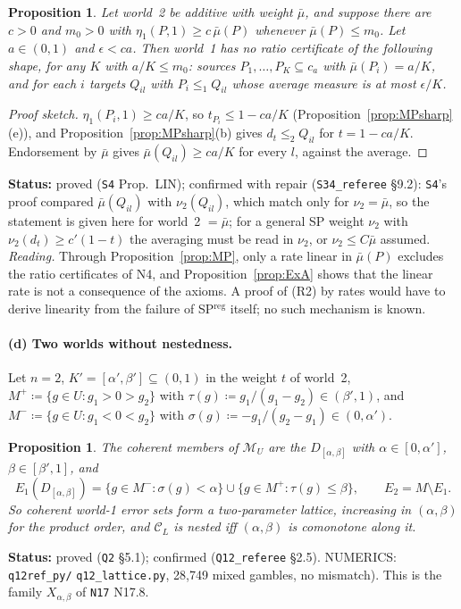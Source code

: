 \documentclass[11pt]{article}
\newtheorem{proposition}[theorem]{Proposition}
\theoremstyle{definition}
\theoremstyle{remark}
\newcommand{\M}{\mathcal M}
\newcommand{\C}{\mathcal C}
\newcommand{\src}[1]{\texttt{#1}}
\newcommand{\status}[1]{\par\smallskip\noindent\textbf{Status:} #1\par\smallskip}
\begin{document}
\begin{proposition}\label{prop:LIN}
Let world~2 be additive with weight $\bar\mu$, and suppose there are $c>0$ and $m_0>0$ with $\eta_1(P,1)\ge c\,\bar\mu(P)$ whenever $\bar\mu(P)\le m_0$. Let $a\in(0,1)$ and $\epsilon<ca$. Then world~1 has no ratio certificate of the following shape, for any $K$ with $a/K\le m_0$: sources $P_1,\dots,P_K\subseteq c_a$ with $\bar\mu(P_i)=a/K$, and for each $i$ targets $Q_{il}$ with $P_i\le_1Q_{il}$ whose average measure is at most $\epsilon/K$.
\end{proposition}
\begin{proof}[Proof sketch]
$\eta_1(P_i,1)\ge ca/K$, so $t_{P_i}\le1-ca/K$ (Proposition~\ref{prop:MPsharp}(e)), and Proposition~\ref{prop:MPsharp}(b) gives $d_t\le_2Q_{il}$ for $t=1-ca/K$. Endorsement by $\bar\mu$ gives $\bar\mu(Q_{il})\ge ca/K$ for every $l$, against the average.
\end{proof}
\status{proved (\src{S4} Prop.~LIN); confirmed with repair (\src{S34\_referee} \S9.2): \src{S4}'s proof compared $\bar\mu(Q_{il})$ with $\nu_2(Q_{il})$, which match only for $\nu_2=\bar\mu$, so the statement is given here for world~2 $=\bar\mu$; for a general SP weight $\nu_2$ with $\nu_2(d_t)\ge c'(1-t)$ the averaging must be read in $\nu_2$, or $\nu_2\le C\bar\mu$ assumed. \emph{Reading.} Through Proposition~\ref{prop:MP}, only a rate linear in $\bar\mu(P)$ excludes the ratio certificates of N4, and Proposition~\ref{prop:ExA} shows that the linear rate is not a consequence of the axioms. A proof of (R2) by rates would have to derive linearity from the failure of SP$^{\mathrm{reg}}$ itself; no such mechanism is known.}

\paragraph{(d) Two worlds without nestedness.} Let $n=2$, $K'=[\alpha',\beta']\subseteq(0,1)$ in the weight $t$ of world~2, $M^+\coloneqq\{g\in U:g_1>0>g_2\}$ with $\tau(g)\coloneqq g_1/(g_1-g_2)\in(\beta',1)$, and $M^-\coloneqq\{g\in U:g_1<0<g_2\}$ with $\sigma(g)\coloneqq-g_1/(g_2-g_1)\in(0,\alpha')$.

\begin{proposition}\label{prop:lattice}
The coherent members of $\M_U$ are the $D_{[\alpha,\beta]}$ with $\alpha\in[0,\alpha']$, $\beta\in[\beta',1]$, and
\[
E_1(D_{[\alpha,\beta]})=\{g\in M^-:\sigma(g)<\alpha\}\cup\{g\in M^+:\tau(g)\le\beta\},\qquad E_2=M\setminus E_1 .
\]
So coherent world-1 error sets form a two-parameter lattice, increasing in $(\alpha,\beta)$ for the product order, and $\C_L$ is nested iff $(\alpha,\beta)$ is comonotone along it.
\end{proposition}
\status{proved (\src{Q2} \S5.1); confirmed (\src{Q12\_referee} \S2.5). NUMERICS: \src{q12ref\_py/} \src{q12\_lattice.py}, 28{,}749 mixed gambles, no mismatch). This is the family $X_{\alpha,\beta}$ of \src{N17} N17.8.}
\end{document}
